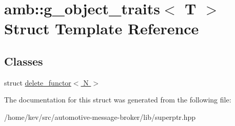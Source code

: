 \hypertarget{structamb_1_1g__object__traits_3_01T_01_4}{\section{amb\+:\+:g\+\_\+object\+\_\+traits$<$ T $>$ Struct Template Reference}
\label{structamb_1_1g__object__traits_3_01T_01_4}
}
\subsection*{Classes}
\begin{DoxyCompactItemize}
\item 
struct \hyperlink{structamb_1_1g__object__traits_3_01T_01_4_1_1delete__functor_3_01N_01_4}{delete\+\_\+functor$<$ N $>$}
\end{DoxyCompactItemize}


The documentation for this struct was generated from the following file\+:\begin{DoxyCompactItemize}
\item 
/home/kev/src/automotive-\/message-\/broker/lib/superptr.\+hpp\end{DoxyCompactItemize}
